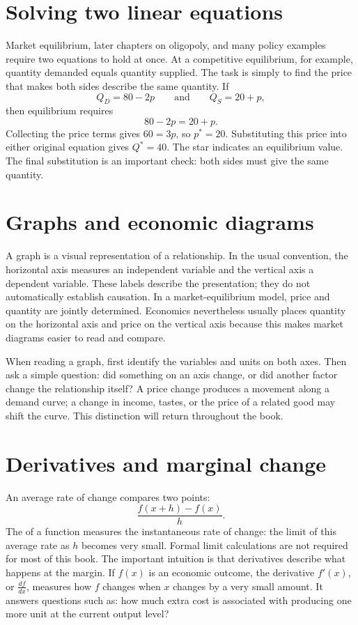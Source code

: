 \section{Solving two linear equations}

Market equilibrium, later chapters on oligopoly, and many policy examples
require two equations to hold at once. At a competitive equilibrium, for
example, quantity demanded equals quantity supplied. The task is simply to
find the price that makes both sides describe the same quantity. If
\[
Q_D=80-2p
\qquad\text{and}\qquad
Q_S=20+p,
\]
then equilibrium requires
\[
80-2p=20+p.
\]
Collecting the price terms gives $60=3p$, so $p^*=20$. Substituting this
price into either original equation gives $Q^*=40$. The star indicates an
equilibrium value. The final substitution is an important check: both sides
must give the same quantity.

\section{Graphs and economic diagrams}

A graph is a visual representation of a relationship. In the usual
convention, the horizontal axis measures an independent variable and the
vertical axis a dependent variable. These labels describe the presentation;
they do not automatically establish causation. In a market-equilibrium model,
price and quantity are jointly determined. Economics nevertheless usually
places quantity on the horizontal axis and price on the vertical axis because
this makes market diagrams easier to read and compare.

When reading a graph, first identify the variables and units on both axes.
Then ask a simple question: did something on an axis change, or did another
factor change the relationship itself? A price change produces a movement
along a demand curve; a change in income, tastes, or the price of a related
good may shift the curve. This distinction will return throughout the book.

\section{Derivatives and marginal change}

An average rate of change compares two points:
\[
\frac{f(x+h)-f(x)}{h}.
\]
The  of a function measures the instantaneous rate of
change: the limit of this average rate as $h$ becomes very small. Formal
limit calculations are not required for most of this book. The important
intuition is that derivatives describe what happens at the margin. If $f(x)$
is an economic outcome, the derivative $f'(x)$, or $\frac{df}{dx}$, measures
how $f$ changes when $x$ changes by a very small amount. It answers questions
such as: how much extra cost is associated with producing one more unit at
the current output level?


